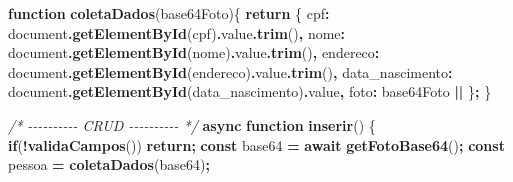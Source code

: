 \documentclass[
]{book}
\newenvironment{Shaded}{\begin{snugshade}}{\end{snugshade}}
\newcommand{\AttributeTok}[1]{\textcolor[rgb]{0.13,0.29,0.53}{#1}}
\newcommand{\BuiltInTok}[1]{#1}
\newcommand{\CommentTok}[1]{\textcolor[rgb]{0.56,0.35,0.01}{\textit{#1}}}
\newcommand{\ControlFlowTok}[1]{\textcolor[rgb]{0.13,0.29,0.53}{\textbf{#1}}}
\newcommand{\DataTypeTok}[1]{\textcolor[rgb]{0.13,0.29,0.53}{#1}}
\newcommand{\FunctionTok}[1]{\textcolor[rgb]{0.13,0.29,0.53}{\textbf{#1}}}
\newcommand{\KeywordTok}[1]{\textcolor[rgb]{0.13,0.29,0.53}{\textbf{#1}}}
\newcommand{\NormalTok}[1]{#1}
\newcommand{\OperatorTok}[1]{\textcolor[rgb]{0.81,0.36,0.00}{\textbf{#1}}}
\newcommand{\StringTok}[1]{\textcolor[rgb]{0.31,0.60,0.02}{#1}}
\begin{document}
\begin{Shaded}
\begin{Highlighting}[]
\KeywordTok{function} \FunctionTok{coletaDados}\NormalTok{(base64Foto)\{}
  \ControlFlowTok{return}\NormalTok{ \{}
    \DataTypeTok{cpf}\OperatorTok{:} \BuiltInTok{document}\OperatorTok{.}\FunctionTok{getElementById}\NormalTok{(}\StringTok{\textquotesingle{}cpf\textquotesingle{}}\NormalTok{)}\OperatorTok{.}\AttributeTok{value}\OperatorTok{.}\FunctionTok{trim}\NormalTok{()}\OperatorTok{,}
    \DataTypeTok{nome}\OperatorTok{:} \BuiltInTok{document}\OperatorTok{.}\FunctionTok{getElementById}\NormalTok{(}\StringTok{\textquotesingle{}nome\textquotesingle{}}\NormalTok{)}\OperatorTok{.}\AttributeTok{value}\OperatorTok{.}\FunctionTok{trim}\NormalTok{()}\OperatorTok{,}
    \DataTypeTok{endereco}\OperatorTok{:} \BuiltInTok{document}\OperatorTok{.}\FunctionTok{getElementById}\NormalTok{(}\StringTok{\textquotesingle{}endereco\textquotesingle{}}\NormalTok{)}\OperatorTok{.}\AttributeTok{value}\OperatorTok{.}\FunctionTok{trim}\NormalTok{()}\OperatorTok{,}
    \DataTypeTok{data\_nascimento}\OperatorTok{:} \BuiltInTok{document}\OperatorTok{.}\FunctionTok{getElementById}\NormalTok{(}\StringTok{\textquotesingle{}data\_nascimento\textquotesingle{}}\NormalTok{)}\OperatorTok{.}\AttributeTok{value}\OperatorTok{,}
    \DataTypeTok{foto}\OperatorTok{:}\NormalTok{ base64Foto }\OperatorTok{||} \StringTok{\textquotesingle{}\textquotesingle{}}
\NormalTok{  \}}\OperatorTok{;}
\NormalTok{\}}

\CommentTok{/* {-}{-}{-}{-}{-}{-}{-}{-}{-}{-} CRUD {-}{-}{-}{-}{-}{-}{-}{-}{-}{-} */}
\KeywordTok{async} \KeywordTok{function} \FunctionTok{inserir}\NormalTok{() \{}
  \ControlFlowTok{if}\NormalTok{(}\OperatorTok{!}\FunctionTok{validaCampos}\NormalTok{()) }\ControlFlowTok{return}\OperatorTok{;}
  \KeywordTok{const}\NormalTok{ base64 }\OperatorTok{=} \ControlFlowTok{await} \FunctionTok{getFotoBase64}\NormalTok{()}\OperatorTok{;}
  \KeywordTok{const}\NormalTok{ pessoa }\OperatorTok{=} \FunctionTok{coletaDados}\NormalTok{(base64)}\OperatorTok{;}


\end{Highlighting}
\end{Shaded}
\end{document}
